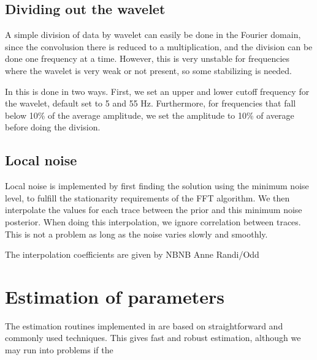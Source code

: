 \subsection{Dividing out the wavelet}
A simple division of data by wavelet can easily be done in the Fourier domain, since the convolusion there is reduced to a multiplication, and the division can be done one frequency at a time. However, this is very unstable for frequencies where the wavelet is very weak or not present, so some stabilizing is needed.

In \crava this is done in two ways. First, we set an upper and lower cutoff frequency for the wavelet, default set to 5 and 55 Hz. Furthermore, for frequencies that fall below 10\% of the average amplitude, we set the amplitude to 10\% of average before doing the division.

\subsection{Local noise}
\label{sec:localnoiseimp}
Local noise is implemented by first finding the solution using the minimum noise level, to fulfill the stationarity requirements of the FFT algorithm. We then interpolate the values for each trace between the prior and this minimum noise posterior. When doing this interpolation, we ignore correlation between traces. This is not a problem as long as the noise varies slowly and smoothly.

The interpolation coefficients are given by NBNB Anne Randi/Odd

\section{Estimation of parameters}
\label{sec:estimateimp}
The estimation routines implemented in \crava are based on straightforward and commonly used techniques. This gives fast and robust estimation, although we may run into problems if the
